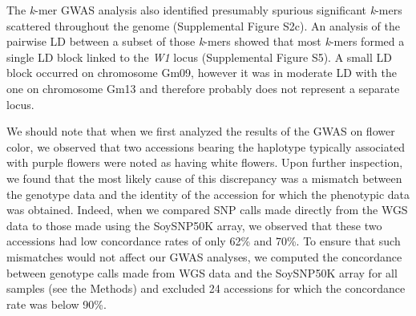 \documentclass{article}
\begin{document}
\begin{figure}
\end{figure}

The \textit{k}-mer GWAS analysis also identified presumably spurious significant
\textit{k}-mers scattered throughout the genome (Supplemental Figure
S2c). An analysis of the pairwise LD between a subset
of those \textit{k}-mers showed that most \textit{k}-mers formed a single LD block
linked to the \textit{W1} locus (Supplemental Figure S5). A small LD block
occurred on chromosome Gm09, however it was in moderate LD with the one on chromosome
Gm13 and therefore probably does not represent a separate locus.

We should note that when we first analyzed the results of the GWAS on flower
color, we observed that two accessions bearing the haplotype typically
associated with purple flowers were noted as having white flowers. Upon further
inspection, we found that the most likely cause of this discrepancy was a
mismatch between the genotype data and the identity of the accession for which
the phenotypic data was obtained. Indeed, when we compared SNP calls made
directly from the WGS data to those made using the SoySNP50K array, we observed
that these two accessions had low concordance rates of only 62\% and 70\%. To
ensure that such mismatches would not affect our GWAS analyses, we computed the
concordance between genotype calls made from WGS data and the SoySNP50K array
for all samples (see the Methods) and excluded 24 accessions for which the
concordance rate was below 90\%.
\end{document}
